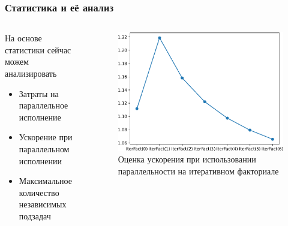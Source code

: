 \documentclass
  [ russian
  , aspectratio=169 %
  ] {beamer}
\begin{document}
\begin{frame}
    \frametitle{Статистика и её анализ}

    \begin{columns}
        \begin{column}{0.45\linewidth}
            На основе статистики сейчас можем анализировать
            \begin{itemize}
                \item Затраты на параллельное исполнение
                \item Ускорение при параллельном исполнении
                \item Максимальное количество независимых подзадач
            \end{itemize}
        \end{column}
        \begin{column}{0.5\linewidth}
            \begin{figure}
                \begin{center}
                    \includegraphics[width=\linewidth, page=2]{figures/Figures_cropped.pdf}
                \end{center}
                \caption{Оценка ускорения при использовании параллельности на итеративном факториале}
            \end{figure}
        \end{column}
    \end{columns}

\end{frame}
\end{document}
